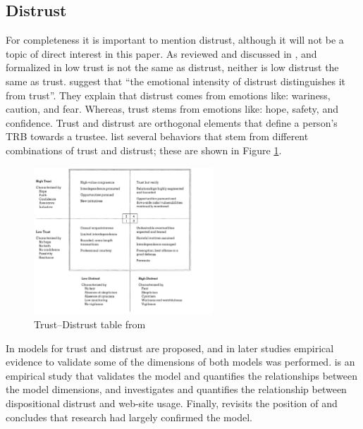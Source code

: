     \subsection{Distrust}
        For completeness it is important to mention distrust, although it will not be a topic of direct interest in this paper. As reviewed and discussed in \cite{Lewicki1998-ox}, and formalized in \cite{McKnight2001-gz} low trust is not the same as distrust, neither is low distrust the same as trust. \citet{McKnight2001-gz} suggest that ``the emotional intensity of distrust distinguishes it from trust''. They explain that distrust comes from emotions like: wariness, caution, and fear. Whereas, trust stems from emotions like: hope, safety, and confidence. Trust and distrust are orthogonal elements that define a person's TRB towards a trustee. \citet{Lewicki1998-ox} list several behaviors that stem from different combinations of trust and distrust; these are shown in Figure \ref{fig:distrust_table}.

        \begin{figure}[htbp]
            \centering
            \includegraphics[width=0.6\textwidth]{Figures/distrust_table}
            \caption{Trust--Distrust table from \cite{Lewicki1998-ox}}
            \label{fig:distrust_table}
        \end{figure}

        In \citet{McKnight2001-gz} models for trust and distrust are proposed, and in later studies empirical evidence to validate some of the dimensions of both models was performed. \citet{McKnight2002-qx} is an empirical study that validates the model and quantifies the relationships between the model dimensions, and \citet{Harrison_McKnight2004-vv} investigates and quantifies the relationship between dispositional distrust and web-site usage. Finally, \citet{McKnight2006-ce} revisits the position of \citet{McKnight1998-ty} and concludes that research had largely confirmed the model.

